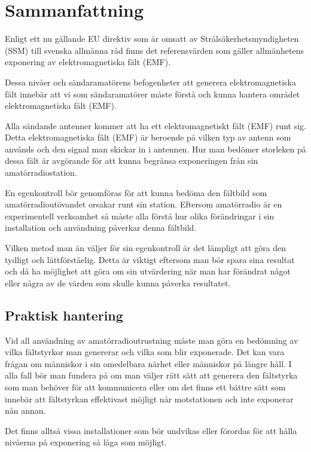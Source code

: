 \section{Sammanfattning}

Enligt ett nu gällande EU direktiv som är omsatt av
Strålsäkerhetsmyndigheten (SSM) till svenska allmänna råd finns det
referensvärden som gäller allmänhetens exponering av elektromagnetiska
fält (EMF).

Dessa nivåer och sändaramatörens befogenheter att generera
elektromagnetiska fält innebär att vi som sändaramatörer måste förstå
och kunna hantera området elektromagnetiska fält (EMF).

Alla sändande antenner kommer att ha ett elektromagnetiskt fält (EMF)
runt sig. Detta elektromagnetiska fält (EMF) är beroende på vilken
typ av antenn som används och den signal man skickar in i antennen.
Hur man bedömer storleken på dessa fält är avgörande för att kunna
begränsa exponeringen från sin amatörradiostation.

En egenkontroll bör genomföras för att kunna bedöma den fältbild som
amatörradioutövandet orsakar runt sin station. Eftersom amatörradio
är en experimentell verksamhet så måste alla förstå hur olika
förändringar i sin installation och användning påverkar denna fältbild.

Vilken metod man än väljer för sin egenkontroll är det lämpligt att
göra den tydligt och lättförståelig. Detta är viktigt eftersom man
bör spara sina resultat och då ha möjlighet att göra om sin utvärdering
när man har förändrat något eller några av de värden som skulle kunna
påverka resultatet.

\subsection{Praktisk hantering}

Vid all användning av amatörradioutrustning måste man göra en bedömning
av vilka fältstyrkor man genererar och vilka som blir exponerade. Det
kan vara frågan om människor i sin omedelbara närhet eller människor
på längre håll. I alla fall bör man fundera på om man väljer rätt sätt
att generera den fältstyrka som man behöver för att kommunicera eller
om det finns ett bättre sätt som innebär att fältstyrkan effektivast
möjligt når motstationen och inte exponerar nån annan.

Det finns alltså vissa installationer som bör undvikas eller förordas
för att hålla nivåerna på exponering så låga som möjligt.

